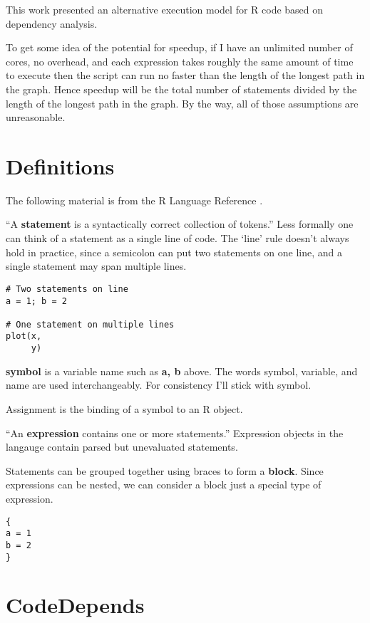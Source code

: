 \documentclass[12pt]{article}
\begin{document}
This work presented an alternative execution model for R code based on
dependency analysis.

To get some idea of the potential for speedup, if I have an unlimited
number of cores, no overhead, and each expression takes roughly the same
amount of time to execute then the script can run no faster than the length
of the longest path in the graph. Hence speedup will be the total number
of statements divided by the length of the longest path in the graph.
By the way, all of those assumptions are unreasonable.

\appendix
\section{Definitions}

The following material is from the R Language Reference \cite{Rlang}.

``A \textbf{statement} is a
syntactically correct collection of tokens.'' Less formally one can think of
a statement as a single line of code. The `line' rule doesn't always hold in practice,
since a semicolon can put two statements on one line, and a single
statement may span multiple lines.

\begin{verbatim}
# Two statements on line
a = 1; b = 2

# One statement on multiple lines
plot(x,
     y)
\end{verbatim}

\textbf{symbol} is a variable name such as \textbf{a, b} above.  The words
symbol, variable, and name are used interchangeably. For consistency I'll
stick with symbol.

Assignment is the binding of a symbol to an R object.

``An \textbf{expression} contains one or more statements.'' Expression objects
in the langauge contain parsed but unevaluated statements. 

Statements can be grouped together using braces to form a \textbf{block}.
Since expressions can be nested, we can consider a block just a special
type of expression.

\begin{verbatim}
{
a = 1
b = 2
}
\end{verbatim}

\section{CodeDepends}
\end{document}
